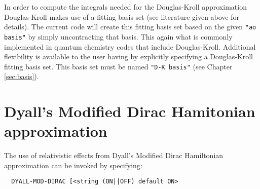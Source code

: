 In order to compute the integrals needed for the Douglas-Kroll approximation 
Douglas-Kroll makes use of a fitting basis set (see literature given above 
for details). The current code will create this fitting basis set based on 
the given {\tt "ao basis"} by simply uncontracting that basis. This again what is 
commonly implemented in quantum chemistry codes that include Douglas-Kroll.
Additional flexibility is available to the user having by explicitly specifying
a Douglas-Kroll fitting basis set. This basis set must be named {\tt "D-K basis"}
(see Chapter \ref{sec:basis}).

\section{Dyall's Modified Dirac Hamitonian approximation}
\label{sec:dyall-mod-dir}




The use of relativistic effects from Dyall's Modified Dirac Hamiltonian 
approximation can be invoked by specifying:

\begin{verbatim}
  DYALL-MOD-DIRAC [<string (ON||OFF) default ON> 

\end{verbatim}





